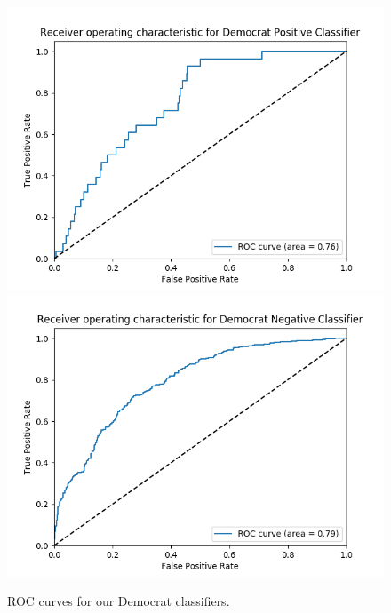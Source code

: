 \documentclass[12pt]{article}
\begin{document}
\begin{figure}[H]
                  \includegraphics[width=\linewidth]{DemocratPositiveClassifier.png}
        \endminipage\hfill
                  \includegraphics[width=\linewidth]{DemocratNegativeClassifier.png}
        \endminipage
        \caption{ROC curves for our Democrat classifiers.}
\end{figure}
\end{document}
